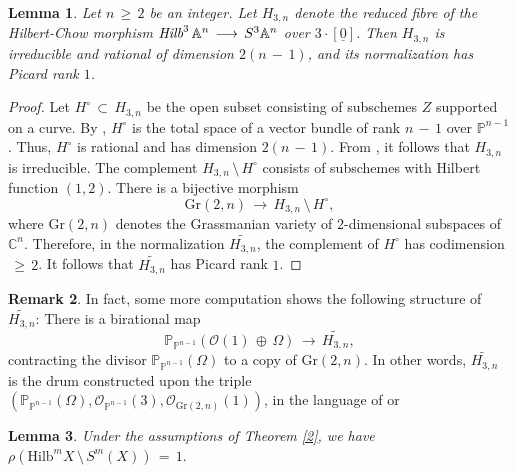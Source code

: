 \documentclass[12pt,reqno]{amsart}
\newtheorem{lemma}{Lemma}[section]
\theoremstyle{definition}
\newtheorem{remark}[lemma]{Remark}
\numberwithin{equation}{section}
\begin{document}
\begin{lemma}\label{Hilbert drum}
Let $n\,\geq\,2$ be an integer. Let $H_{3,n}$ denote the reduced fibre of the Hilbert-Chow morphism $\emph{Hilb}^{3}\,\mathbb{A}^{n}\,\longrightarrow\, S^{3}\mathbb{A}^{n}$ over $3\cdot[\underline{0}]$.  Then $H_{3,n}$ is irreducible and rational of dimension $2(n\,-\,1)$, and its normalization has Picard rank $1$.
\end{lemma}
\begin{proof}
Let $H^{\circ}\,\subset\, H_{3,n}$ be the open subset consisting of subschemes $Z$ supported on  a curve. By \cite[Lemma 3.2]{JT}, $H^{\circ}$ is the total space of a vector bundle of rank $n\,-\,1$ over $\mathbb{P}^{n-1}$. Thus, $H^{\circ}$ is rational and has dimension $2(n\,-\,1)$. From \cite{JK}, it follows that $H_{3,n}$ is irreducible. The complement $H_{3,n}\,\setminus\, H^{\circ}$ consists of subschemes with Hilbert function $(1,2)$. There is a bijective morphism
$$\textrm{Gr}(2,n)\,\longrightarrow\, H_{3,n} \,\setminus\, H^{\circ},$$
where $\textrm{Gr}(2,n)$ denotes the Grassmanian variety of $2$-dimensional subspaces of $\mathbb{C}^{n}$. Therefore, in the normalization $\widetilde{H_{3,n}}$, the complement of $H^{\circ}$ has codimension $\,\geq\, 2$. It follows that $\widetilde{H_{3,n}}$ has Picard rank $1$.  
\end{proof}
\begin{remark}\label{drum}
In fact, some more computation shows the following structure of $\widetilde{H_{3,n}}$: There is a birational map
\begin{equation*}
\mathbb{P}_{\mathbb{P}^{n-1}}(\mathcal{O}(1)\,\oplus\,\Omega)\,\longrightarrow\, \widetilde{H_{3,n}},   \end{equation*}
contracting the divisor $\mathbb{P}_{\mathbb{P}^{n-1}}(\Omega)$ to a copy of $\textrm{Gr}(2,n)$. In other words, $\widetilde{{H}_{3,n}}$ is the drum constructed upon the triple $(\mathbb{P}_{\mathbb{P}^{n-1}}(\Omega), \mathcal{O}_{\mathbb{P}^{n-1}}(3), \mathcal{O}_{{\textrm{Gr}}(2,n)}(1))$, in the language of \cite{ORSW} or \cite{bansal2024extremal}
\end{remark}
\begin{lemma}\label{rho}
    Under the assumptions of Theorem \ref{2}, we have $\rho(\textrm{Hilb}^{m}X\,\setminus\, S^{m}(X))\,=\,1.$
\end{lemma}
\end{document}

